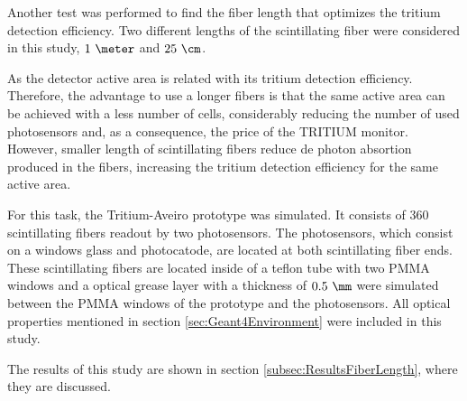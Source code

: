 Another test was performed to find the fiber length that optimizes the tritium detection efficiency. Two different lengths of the scintillating fiber were considered in this study, $1~\meter$ and $25~\cm$. 

As the detector active area is related with its tritium detection efficiency. Therefore, the advantage to use a longer fibers is that the same active area can be achieved with a less number of cells, considerably reducing the number of used photosensors and, as a consequence, the price of the TRITIUM monitor. However, smaller length of scintillating fibers reduce de photon absortion produced in the fibers, increasing the tritium detection efficiency for the same active area.

For this task, the Tritium-Aveiro prototype was simulated. It consists of $360$ scintillating fibers readout by two photosensors. The photosensors, which consist on a windows glass and photocatode, are located at both scintillating fiber ends. These scintillating fibers are located inside of a teflon tube with two PMMA windows and a optical grease layer with a thickness of $0.5~\mm$ were simulated between the PMMA windows of the prototype and the photosensors. All optical properties mentioned in section \ref{sec:Geant4Environment} were included in this study.

The results of this study are shown in section \ref{subsec:ResultsFiberLength}, where they are discussed.